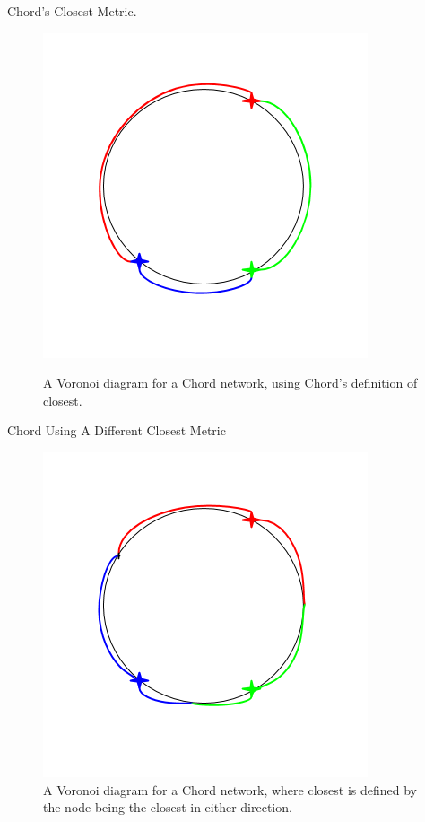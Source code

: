 \documentclass[11pt]{beamer}
\begin{document}
\begin{frame}{Chord's Closest Metric.}
	\begin{figure}
		\centering
		
		\caption{A Voronoi diagram for a Chord network, using Chord's definition of closest.}
		\includegraphics[width=0.5\linewidth]{figs/voro-chord-normal}
		\label{fig:voro-chord-normal}
	\end{figure}
	
\end{frame}


\begin{frame}{Chord Using A Different Closest Metric}
	\begin{figure}
		\centering
		\caption{A Voronoi diagram for a Chord network, where closest is defined by the node being the closest in either direction.}
		\includegraphics[width=0.5\linewidth]{figs/voro-chord-alternative}
		
		\label{fig:voro-chord-alternative}
	\end{figure}
\end{frame}
\end{document}
